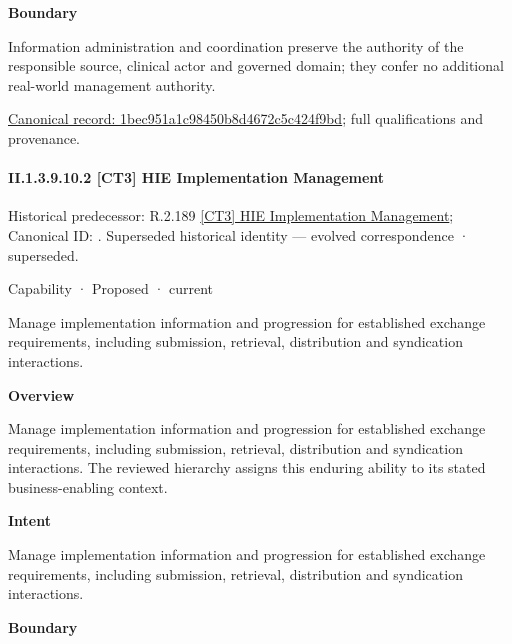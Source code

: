 \textbf{Boundary}



Information administration and coordination preserve the authority of the responsible source, clinical actor and governed domain; they confer no additional real-world management authority.


{\footnotesize \href{../../../../../../../continuum/strategy/capability/1bec951a1c98450b8d4672c5c424f9bd.md}{Canonical record: 1bec951a1c98450b8d4672c5c424f9bd}; full qualifications and provenance.}\par
\paragraph*{II.1.3.9.10.2 [CT3] HIE Implementation Management}
\label{navigation:II.1.3.9.10.2}

{\small Historical predecessor: R.2.189 \hyperref[element:a99b4119339545a89dc54ebb216ddb85]{[CT3] HIE Implementation Management}; Canonical ID: \texttt{}. Superseded historical identity — evolved correspondence · superseded.}\par
\label{element:8ce29be373e04252b7aa881b6a72f375}
{\small Capability · Proposed · current}\par

Manage implementation information and progression for established exchange requirements, including submission, retrieval, distribution and syndication interactions.



\textbf{Overview}



Manage implementation information and progression for established exchange requirements, including submission, retrieval, distribution and syndication interactions. The reviewed hierarchy assigns this enduring ability to its stated business-enabling context.



\textbf{Intent}



Manage implementation information and progression for established exchange requirements, including submission, retrieval, distribution and syndication interactions.



\textbf{Boundary}



